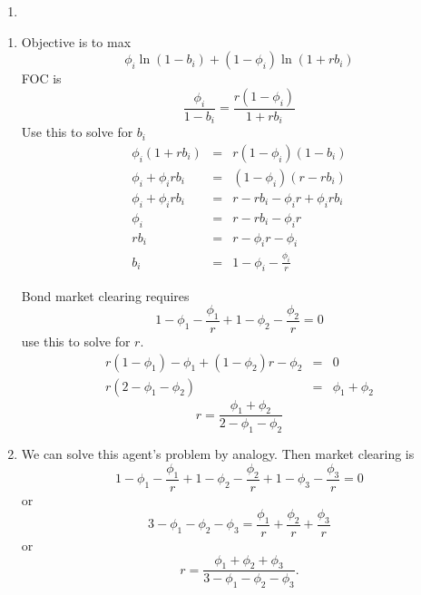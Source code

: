 \documentclass{article}
\begin{document}
\begin{enumerate}
\begin{enumerate}
\item 
\end{enumerate}

\begin{enumerate}
\item Objective is to max%
\begin{equation*}
\phi _{i}\ln \left( 1-b_{i}\right) +\left( 1-\phi _{i}\right) \ln \left(
1+rb_{i}\right)
\end{equation*}%
FOC is 
\begin{equation*}
\frac{\phi _{i}}{1-b_{i}}=\frac{r\left( 1-\phi _{i}\right) }{1+rb_{i}}
\end{equation*}%
Use this to solve for $b_{i}$ 
\begin{eqnarray*}
\phi _{i}\left( 1+rb_{i}\right) &=&r\left( 1-\phi _{i}\right) \left(
1-b_{i}\right) \\
\phi _{i}+\phi _{i}rb_{i} &=&\left( 1-\phi _{i}\right) \left( r-rb_{i}\right)
\\
\phi _{i}+\phi _{i}rb_{i} &=&r-rb_{i}-\phi _{i}r+\phi _{i}rb_{i} \\
\phi _{i} &=&r-rb_{i}-\phi _{i}r \\
rb_{i} &=&r-\phi _{i}r-\phi _{i} \\
b_{i} &=&1-\phi _{i}-\frac{\phi _{i}}{r}
\end{eqnarray*}

Bond market clearing requires 
\begin{equation*}
1-\phi _{1}-\frac{\phi _{1}}{r}+1-\phi _{2}-\frac{\phi _{2}}{r}=0
\end{equation*}%
use this to solve for $r$.%
\begin{eqnarray*}
r\left( 1-\phi _{1}\right) -\phi _{1}+\left( 1-\phi _{2}\right) r-\phi _{2}
&=&0 \\
r\left( 2-\phi _{1}-\phi _{2}\right) &=&\phi _{1}+\phi _{2}
\end{eqnarray*}%
\begin{equation*}
r=\frac{\phi _{1}+\phi _{2}}{2-\phi _{1}-\phi _{2}}
\end{equation*}

\item We can solve this agent's problem by analogy. Then market clearing is 
\begin{equation*}
1-\phi _{1}-\frac{\phi _{1}}{r}+1-\phi _{2}-\frac{\phi _{2}}{r}+1-\phi _{3}-%
\frac{\phi _{3}}{r}=0
\end{equation*}%
or%
\begin{equation*}
3-\phi _{1}-\phi _{2}-\phi _{3}=\frac{\phi _{1}}{r}+\frac{\phi _{2}}{r}+%
\frac{\phi _{3}}{r}
\end{equation*}%
or%
\begin{equation*}
r=\frac{\phi _{1}+\phi _{2}+\phi _{3}}{3-\phi _{1}-\phi _{2}-\phi _{3}}.
\end{equation*}
\end{enumerate}
\end{enumerate}
\end{document}
